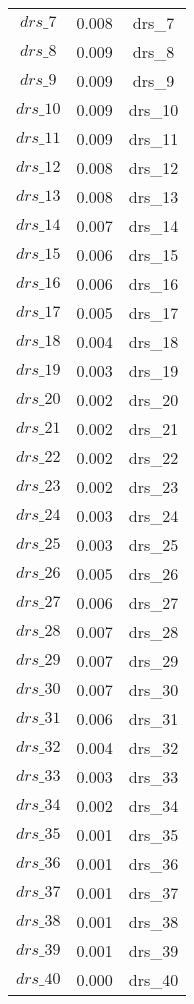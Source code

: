 \begin{center}
\begin{longtable}{ccc}
$drs\_7$ 	 & 	 0.008 	 & 	 drs\_7\\
$drs\_8$ 	 & 	 0.009 	 & 	 drs\_8\\
$drs\_9$ 	 & 	 0.009 	 & 	 drs\_9\\
$drs\_10$ 	 & 	 0.009 	 & 	 drs\_10\\
$drs\_11$ 	 & 	 0.009 	 & 	 drs\_11\\
$drs\_12$ 	 & 	 0.008 	 & 	 drs\_12\\
$drs\_13$ 	 & 	 0.008 	 & 	 drs\_13\\
$drs\_14$ 	 & 	 0.007 	 & 	 drs\_14\\
$drs\_15$ 	 & 	 0.006 	 & 	 drs\_15\\
$drs\_16$ 	 & 	 0.006 	 & 	 drs\_16\\
$drs\_17$ 	 & 	 0.005 	 & 	 drs\_17\\
$drs\_18$ 	 & 	 0.004 	 & 	 drs\_18\\
$drs\_19$ 	 & 	 0.003 	 & 	 drs\_19\\
$drs\_20$ 	 & 	 0.002 	 & 	 drs\_20\\
$drs\_21$ 	 & 	 0.002 	 & 	 drs\_21\\
$drs\_22$ 	 & 	 0.002 	 & 	 drs\_22\\
$drs\_23$ 	 & 	 0.002 	 & 	 drs\_23\\
$drs\_24$ 	 & 	 0.003 	 & 	 drs\_24\\
$drs\_25$ 	 & 	 0.003 	 & 	 drs\_25\\
$drs\_26$ 	 & 	 0.005 	 & 	 drs\_26\\
$drs\_27$ 	 & 	 0.006 	 & 	 drs\_27\\
$drs\_28$ 	 & 	 0.007 	 & 	 drs\_28\\
$drs\_29$ 	 & 	 0.007 	 & 	 drs\_29\\
$drs\_30$ 	 & 	 0.007 	 & 	 drs\_30\\
$drs\_31$ 	 & 	 0.006 	 & 	 drs\_31\\
$drs\_32$ 	 & 	 0.004 	 & 	 drs\_32\\
$drs\_33$ 	 & 	 0.003 	 & 	 drs\_33\\
$drs\_34$ 	 & 	 0.002 	 & 	 drs\_34\\
$drs\_35$ 	 & 	 0.001 	 & 	 drs\_35\\
$drs\_36$ 	 & 	 0.001 	 & 	 drs\_36\\
$drs\_37$ 	 & 	 0.001 	 & 	 drs\_37\\
$drs\_38$ 	 & 	 0.001 	 & 	 drs\_38\\
$drs\_39$ 	 & 	 0.001 	 & 	 drs\_39\\
$drs\_40$ 	 & 	 0.000 	 & 	 drs\_40\\

\end{longtable}
\end{center}
